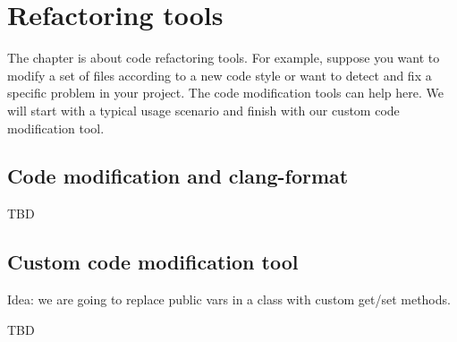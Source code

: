 \chapter{\textbf{Refactoring tools}}
\pagestyle{fancy}
\fancyhf{}
\rhead{\thepage}
 The chapter is about code refactoring tools. For example, suppose you want to
 modify a set of files according to a new code style or want to detect and fix a
 specific problem in your project. The code modification tools can help here. We
 will start with a typical usage scenario and finish with our custom code
 modification tool. 

\section{Code modification and clang-format}
TBD

\section{Custom code modification tool}
Idea: we are going to replace public vars in a class with custom
get/set methods.  


TBD
